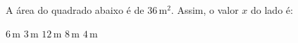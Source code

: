 A \'area do quadrado abaixo \'e de $36$\,m$^2$. Assim, o valor $x$ do lado \'e:

\parbox{0.35\linewidth}{

$6$\,m
$3$\,m
$12$\,m
$8$\,m
$4$\,m

}\parbox{0.64\linewidth}{
\begin{center}
\vspace{-9mm}
\vspace{-9mm}
\end{center}
}


